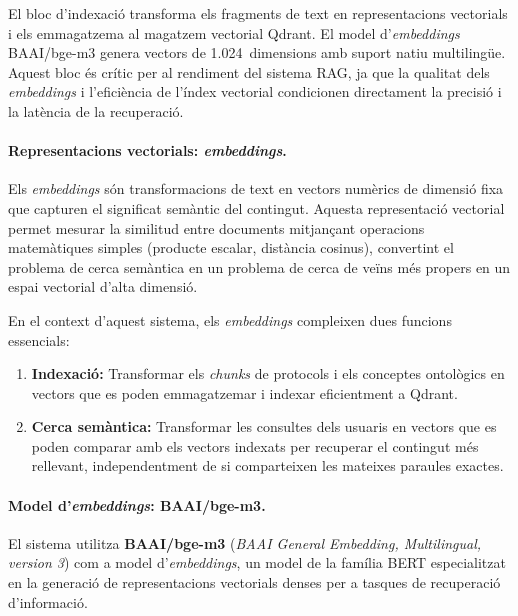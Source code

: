 \documentclass[CAT]{TFUOC}%
\begin{document}
El bloc d'indexació transforma els fragments de text en representacions vectorials i els emmagatzema al magatzem vectorial Qdrant. El model d'\textit{embeddings} BAAI/bge-m3 genera vectors de 1.024~dimensions amb suport natiu multilingüe. Aquest bloc és crític per al rendiment del sistema RAG, ja que la qualitat dels \textit{embeddings} i l'eficiència de l'índex vectorial condicionen directament la precisió i la latència de la recuperació.

\paragraph{Representacions vectorials: \textit{embeddings}.}

Els \textit{embeddings} són transformacions de text en vectors numèrics de dimensió fixa que capturen el significat semàntic del contingut. Aquesta representació vectorial permet mesurar la similitud entre documents mitjançant operacions matemàtiques simples (producte escalar, distància cosinus), convertint el problema de cerca semàntica en un problema de cerca de veïns més propers en un espai vectorial d'alta dimensió.

En el context d'aquest sistema, els \textit{embeddings} compleixen dues funcions essencials:

\begin{enumerate}
    \item \textbf{Indexació:} Transformar els \textit{chunks} de protocols i els conceptes ontològics en vectors que es poden emmagatzemar i indexar eficientment a Qdrant.
    
    \item \textbf{Cerca semàntica:} Transformar les consultes dels usuaris en vectors que es poden comparar amb els vectors indexats per recuperar el contingut més rellevant, independentment de si comparteixen les mateixes paraules exactes.
\end{enumerate}

\paragraph{Model d'\textit{embeddings}: BAAI/bge-m3.}

El sistema utilitza \textbf{BAAI/bge-m3} (\textit{BAAI General Embedding, Multilingual, version 3}) com a model d'\textit{embeddings}, un model de la família BERT especialitzat en la generació de representacions vectorials denses per a tasques de recuperació d'informació.
\end{document}
